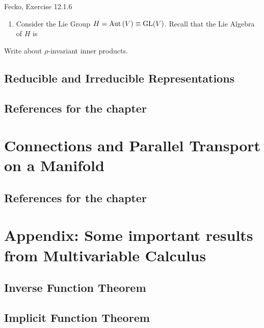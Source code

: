\documentclass[11pt]{article}
\begin{document}
\begin{ex}{Fecko, Exercise 12.1.6}
  \begin{enumerate}[label=(\roman*)]
    \item Consider the Lie Group $H = \mathrm{Aut}\left(V\right) \equiv \mathrm{GL}(V)$. 
    Recall that the Lie Algebra of $H$ is 
  \end{enumerate}
\end{ex}

\vskip 0.5cm
Write about $\rho$-invariant inner products.

\vskip 1cm
\subsection{Reducible and Irreducible Representations}




\vskip 1cm
\subsection*{References for the chapter}


\newpage
\section{Connections and Parallel Transport on a Manifold}

\vskip 1cm
\subsection*{References for the chapter}


\newpage
\section*{Appendix: Some important results from Multivariable Calculus}

\subsection{Inverse Function Theorem}


\subsection{Implicit Function Theorem}
\end{document}
